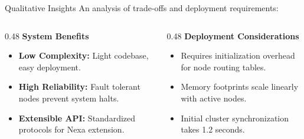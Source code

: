 \begin{frame}{Qualitative Insights}
    An analysis of trade-offs and deployment requirements:
    \begin{columns}
        \begin{column}{0.48\textwidth}
            \textbf{System Benefits}
            \begin{itemize}
                \item \textbf{Low Complexity:} Light codebase, easy deployment.
                \item \textbf{High Reliability:} Fault tolerant nodes prevent system halts.
                \item \textbf{Extensible API:} Standardized protocols for Nexa extension.
            \end{itemize}
        \end{column}
        \begin{column}{0.48\textwidth}
            \textbf{Deployment Considerations}
            \begin{itemize}
                \item Requires initialization overhead for node routing tables.
                \item Memory footprints scale linearly with active nodes.
                \item Initial cluster synchronization takes 1.2 seconds.
            \end{itemize}
        \end{column}
    \end{columns}
\end{frame}
